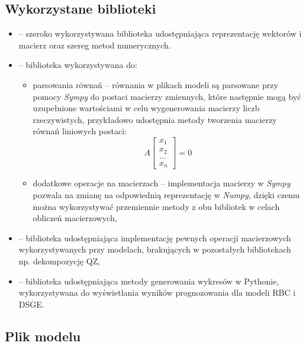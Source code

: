 
\subsection{Wykorzystane biblioteki}
\label{sec:used_libraries}

\begin{itemize}
    \item {} -- szeroko wykorzystywana biblioteka udostępniająca reprezentację wektorów i macierz oraz szereg metod numerycznych.
    \item {} -- biblioteka wykorzystywana do:
        \begin{itemize}
            \item parsowania równań -- równania w plikach modeli są parsowane przy pomocy \emph{Sympy} do postaci macierzy zmiennych, które następnie mogą być uzupełnione wartościami w celu wygenerowania macierzy liczb rzeczywistych, przykładowo udostępnia metody tworzenia macierzy równań liniowych postaci:
            \begin{equation}
                A \begin{bmatrix}
                    x_1 \\
                    x_2 \\
                    \dots \\
                    x_n
                \end{bmatrix} = 0
            \end{equation}
            \item dodatkowe operacje na macierzach -- implementacja macierzy w \emph{Sympy} pozwala na zmianę na odpowiednią reprezentację w \emph{Numpy}, dzięki czemu można wykorzystywać przemiennie metody z obu bibliotek w celach obliczeń macierzowych,
        \end{itemize}
    \item {} -- biblioteka udostępniająca implementację pewnych operacji macierzowych wykorzystywanych przy modelach, brakujących w pozostałych bibliotekach np. dekompozycję QZ,
    \item {} -- biblioteka udostępniająca metody generowania wykresów w Pythonie, wykorzystywana do wyświetlania wyników prognozowania dla modeli RBC i DSGE.
\end{itemize}

\subsection{Plik modelu}

